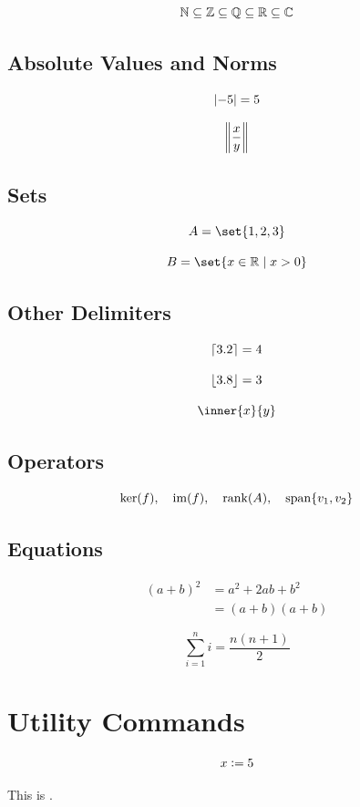 \documentclass{article}
\begin{document}
\[
    \N \subseteq \Z \subseteq \Q \subseteq \R \subseteq \C
\]

\subsection{Absolute Values and Norms}

\[
    \abs{-5} = 5
\]

\[
    \norm*{\frac{x}{y}}
\]

\subsection{Sets}

\[
    A = \set{1,2,3}
\]

\[
    B = \set{x \in \R \mid x > 0}
\]

\subsection{Other Delimiters}

\[
    \ceil{3.2} = 4
\]

\[
    \floor{3.8} = 3
\]

\[
    \inner{x}{y}
\]

\subsection{Operators}

\[
    \ker(f), \quad
    \im(f), \quad
    \rank(A), \quad
    \Span\{v_1,v_2\}
\]

\subsection{Equations}

\begin{align*}
    (a+b)^2
    &= a^2 + 2ab + b^2 \\
    &= (a+b)(a+b)
\end{align*}

\begin{equation}
    \sum_{i=1}^{n} i = \frac{n(n+1)}{2}
\end{equation}


\section{Utility Commands}


\[
    x \defeq 5
\]

This is .
\end{document}
